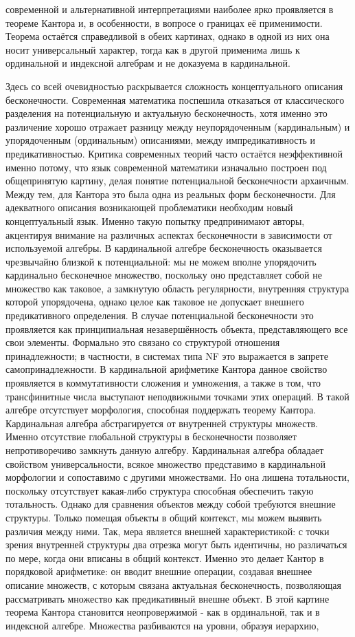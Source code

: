 \documentclass[12pt]{article}
\begin{document}
современной и альтернативной интерпретациями наиболее ярко проявляется в теореме Кантора и, в особенности, в вопросе о границах её применимости. Теорема остаётся справедливой в обеих картинах, однако в одной из них она носит универсальный характер, тогда как в другой применима лишь к ординальной и индексной алгебрам и не доказуема в кардинальной. 

Здесь со всей очевидностью раскрывается сложность концептуального описания бесконечности. Современная математика поспешила отказаться от классического разделения на потенциальную и актуальную бесконечность, хотя именно это различение хорошо отражает разницу между неупорядоченным (кардинальным) и упорядоченным (ординальным) описаниями, между импредикативность и предикативностью. Критика современных теорий часто остаётся неэффективной именно потому, что язык современной математики изначально построен под общепринятую картину, делая понятие потенциальной бесконечности архаичным. Между тем, для Кантора это была одна из реальных форм бесконечности. Для адекватного описания возникающей проблематики необходим новый концептуальный язык. Именно такую попытку предпринимают авторы, акцентируя внимание на различных аспектах бесконечности в зависимости от используемой алгебры. В кардинальной алгебре бесконечность оказывается чрезвычайно близкой к потенциальной: мы не можем вполне упорядочить кардинально бесконечное множество, поскольку оно представляет собой не множество как таковое, а замкнутую область регулярности, внутренняя структура которой упорядочена, однако целое как таковое не допускает внешнего предикативного определения. В случае потенциальной бесконечности это проявляется как принципиальная незавершённость объекта, представляющего все свои элементы. Формально это связано со структурой отношения принадлежности; в частности, в системах типа NF это выражается в запрете самопринадлежности. В кардинальной арифметике Кантора данное свойство проявляется в коммутативности сложения и умножения, а также в том, что трансфинитные числа выступают неподвижными точками этих операций. В такой алгебре отсутствует морфология, способная поддержать теорему Кантора. Кардинальная алгебра абстрагируется от внутренней структуры множеств. Именно отсутствие глобальной структуры в бесконечности позволяет непротиворечиво замкнуть данную алгебру. Кардинальная алгебра обладает свойством универсальности, всякое множество представимо в кардинальной морфологии и сопоставимо с другими множествами. Но она лишена тотальности, поскольку отсутствует какая-либо структура способная обеспечить такую тотальность. Однако для сравнения объектов между собой требуются внешние структуры. Только помещая объекты в общий контекст, мы можем выявить различия между ними. Так, мера является внешней характеристикой: с точки зрения внутренней структуры два отрезка могут быть идентичны, но различаться по мере, когда они вписаны в общий контекст. Именно это делает Кантор в порядковой арифметике: он вводит внешние операции, создавая внешнее описание множеств, с которым связана актуальная бесконечность, позволяющая рассматривать множество как предикативный внешне объект. В этой картине теорема Кантора становится неопровержимой - как в ординальной, так и в индексной алгебре. Множества разбиваются на уровни, образуя иерархию, 
\end{document}
